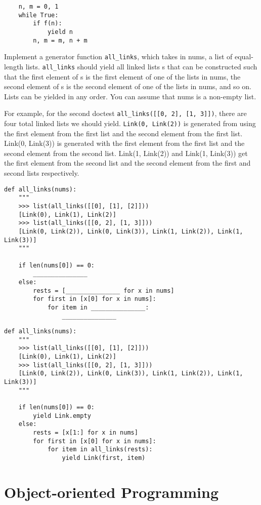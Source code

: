\documentclass{exam}
\begin{document}
\begin{questions}
\begin{solution}
\begin{lstlisting}
	n, m = 0, 1
	while True:
		if f(n):
			yield n
		n, m = m, n + m
\end{lstlisting}
\end{solution}

\begin{blocksection}
	Implement a generator function \lstinline{all_links}, which takes in nums, a list of equal-length lists. \lstinline{all_links} should yield all linked lists s that can be constructed such that the first element of s is the first element of one of the lists in nums, the second element of s is the second element of one of the lists in nums, and so on. Lists can be yielded in any order. You can assume that nums is a non-empty list.
	
	For example, for the second doctest \lstinline{all_links([[0, 2], [1, 3]])}, there are four total linked lists we should yield. \lstinline{Link(0, Link(2))} is generated from using the first element from the first list and the second element from the first list. Link(0, Link(3)) is generated with the first element from the first list and the second element from the second list. Link(1, Link(2)) and Link(1, Link(3)) get the first element from the second list and the second element from the first and second lists respectively.
\begin{lstlisting}
def all_links(nums):
	"""
	>>> list(all_links([[0], [1], [2]]))
	[Link(0), Link(1), Link(2)]
	>>> list(all_links([[0, 2], [1, 3]]))
	[Link(0, Link(2)), Link(0, Link(3)), Link(1, Link(2)), Link(1, Link(3))]
	"""
	
	if len(nums[0]) == 0:
		_______________
	else:
		rests = [_______________ for x in nums]
		for first in [x[0] for x in nums]:
			for item in _______________:
				_______________
\end{lstlisting}
\end{blocksection}
\begin{solution}
\begin{lstlisting}
def all_links(nums):
	"""
	>>> list(all_links([[0], [1], [2]]))
	[Link(0), Link(1), Link(2)]
	>>> list(all_links([[0, 2], [1, 3]]))
	[Link(0, Link(2)), Link(0, Link(3)), Link(1, Link(2)), Link(1, Link(3))]
	"""
		
	if len(nums[0]) == 0:
		yield Link.empty
	else:
		rests = [x[1:] for x in nums]
		for first in [x[0] for x in nums]:
			for item in all_links(rests):
				yield Link(first, item)
\end{lstlisting}
\end{solution}
\section{Object-oriented Programming}


\end{questions}
\end{document}
